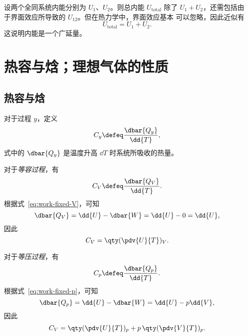 设两个全同系统内能分别为 $U_1$、$U_2$。则总内能 $U_\text{total}$ 除了
$U_1+U_2$，还需包括由于界面效应所导致的 $U_{12}$。但在热力学中，界面效应基本
可以忽略，因此近似有
\begin{equation}
  U_\text{total} = U_1 + U_2.
\end{equation}
这说明内能是一个广延量。

\section{热容与焓；理想气体的性质} \label{sec:heat-capacity-enthalpy-ideal-gas}

\subsection{热容与焓} \label{subsec:heat-capacity-and-enthalpy}

对于过程 $y$，定义
\begin{equation}
  C_y \defeq \frac{\dbar{Q_y}}{\dd{T}},
\end{equation}
式中的 $\dbar{Q_y}$ 是温度升高 $\dd{T}$ 时系统所吸收的热量。

对于\emph{等容过程}，有
\begin{equation}
  C_V \defeq \frac{\dbar{Q_V}}{\dd{T}}.
\end{equation}
根据式~\eqref{eq:work-fixed-V}，可知
\begin{equation}
  \dbar{Q_V} = \dd{U} - \dbar{W} = \dd{U} - 0 = \dd{U},
\end{equation}
因此
\begin{equation} \label{eq:heat-capacity-fixed-V}
  C_V = \qty(\pdv{U}{T})_V.
\end{equation}

对于\emph{等压过程}，有
\begin{equation}
  C_p \defeq \frac{\dbar{Q_p}}{\dd{T}}.
\end{equation}
根据式~\eqref{eq:work-fixed-p}，可知
\begin{equation} \label{eq:dQ-fixed-p}
  \dbar{Q_p} = \dd{U} - \dbar{W} = \dd{U} - p \dd{V},
\end{equation}
因此
\begin{equation} \label{eq:heat-capacity-fixed-p}
  C_V = \qty(\pdv{U}{T})_p + p \, \qty(\pdv{V}{T})_p.
\end{equation}


